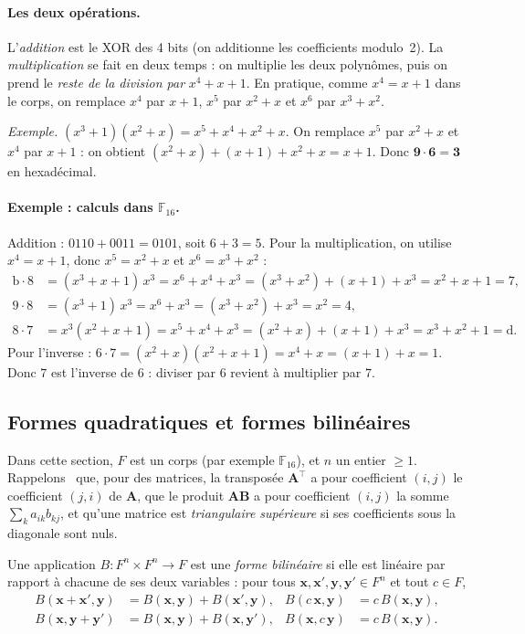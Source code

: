\paragraph{Les deux opérations.} L'\emph{addition} est le XOR des 4 bits (on additionne les coefficients modulo~2). La \emph{multiplication} se fait en deux temps : on multiplie les deux polynômes, puis on prend le \emph{reste de la division par} $x^4+x+1$. En pratique, comme $x^4=x+1$ dans le corps, on remplace $x^4$ par $x+1$, $x^5$ par $x^2+x$ et $x^6$ par $x^3+x^2$.

\emph{Exemple.} $(x^3+1)(x^2+x)=x^5+x^4+x^2+x$. On remplace $x^5$ par $x^2+x$ et $x^4$ par $x+1$ : on obtient $(x^2+x)+(x+1)+x^2+x=x+1$. Donc $\mathbf{9}\cdot\mathbf{6}=\mathbf{3}$ en hexadécimal.

\paragraph{Exemple : calculs dans $\mathbb{F}_{16}$.} Addition : $0110+0011=0101$, soit $6+3=5$. Pour la multiplication, on utilise $x^4=x+1$, donc $x^5=x^2+x$ et $x^6=x^3+x^2$ :
\begin{align*}
\mathrm{b}\cdot8&=(x^3+x+1)\,x^3=x^6+x^4+x^3=(x^3+x^2)+(x+1)+x^3=x^2+x+1=7,\\
9\cdot8&=(x^3+1)\,x^3=x^6+x^3=(x^3+x^2)+x^3=x^2=4,\\
8\cdot7&=x^3(x^2+x+1)=x^5+x^4+x^3=(x^2+x)+(x+1)+x^3=x^3+x^2+1=\mathrm{d}.
\end{align*}
Pour l'inverse : $6\cdot7=(x^2+x)(x^2+x+1)=x^4+x=(x+1)+x=1$. Donc $7$ est l'inverse de $6$ : diviser par $6$ revient à multiplier par $7$.

\subsection{Formes quadratiques et formes bilinéaires}
Dans cette section, $F$ est un corps (par exemple $\mathbb{F}_{16}$), et $n$ un entier $\ge1$. Rappelons~\cite{horn} que, pour des matrices, la transposée $\mathbf{A}^{\top}$ a pour coefficient $(i,j)$ le coefficient $(j,i)$ de $\mathbf{A}$, que le produit $\mathbf{A}\mathbf{B}$ a pour coefficient $(i,j)$ la somme $\sum_k a_{ik}b_{kj}$, et qu'une matrice est \emph{triangulaire supérieure} si ses coefficients sous la diagonale sont nuls.

\begin{definition}
Une application $B:F^n\times F^n\to F$ est une \emph{forme bilinéaire} si elle est linéaire par rapport à chacune de ses deux variables : pour tous $\mathbf{x},\mathbf{x}',\mathbf{y},\mathbf{y}'\in F^n$ et tout $c\in F$,
\begin{align*}
B(\mathbf{x}+\mathbf{x}',\mathbf{y})&=B(\mathbf{x},\mathbf{y})+B(\mathbf{x}',\mathbf{y}), & B(c\,\mathbf{x},\mathbf{y})&=c\,B(\mathbf{x},\mathbf{y}),\\
B(\mathbf{x},\mathbf{y}+\mathbf{y}')&=B(\mathbf{x},\mathbf{y})+B(\mathbf{x},\mathbf{y}'), & B(\mathbf{x},c\,\mathbf{y})&=c\,B(\mathbf{x},\mathbf{y}).
\end{align*}
\end{definition}

